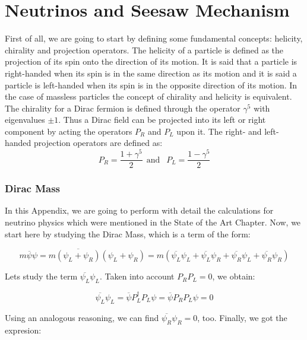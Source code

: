 \chapter{Neutrinos and Seesaw Mechanism} 
\label{apendice_neutrinos}

First of all, we are going to start by defining some fundamental concepts: helicity, chirality and projection operators. The helicity of a particle is defined as the projection of its spin onto the direction of its motion. It is said that a particle is right-handed when its spin is in the same direction as its motion and it is said a particle is left-handed when its spin is in the opposite direction of its motion. In the case of massless particles the concept of chirality and helicity is equivalent. The chirality for a Dirac fermion is defined through the operator $\gamma^5$ with eigenvalues $\pm 1$. Thus a Dirac field can be projected into its left or right component by acting the operators $P_R$ and $P_L$ upon it. The right- and left-handed projection operators are defined as:
\begin{equation}
P_R = \frac{1 + \gamma^5}{2} \ \ \text{and } \ \ P_L = \frac{1 - \gamma^5}{2}
\end{equation}


\subsection{Dirac Mass}
In this Appendix, we are going to perform with detail the calculations for neutrino physics which were mentioned in the State of the Art Chapter. Now, we start here by studying the Dirac Mass, which is a term of the form:

\begin{equation}
 m \overline{\psi} \psi = m \overline{(\psi_L + \psi_R)} (\psi_L + \psi_R) = m(\overline{\psi_L} \psi_L + \overline{\psi_L}\psi_R + \overline{\psi_R}\psi_L + \overline{\psi_R} \psi_R)
\end{equation}

Lets study the term $\overline{\psi_L}\psi_L$. Taken into account $P_R  P_L = 0$, we obtain:

\begin{equation}
 \overline{\psi_L}\psi_L = \overline{\psi} {P}^{\dagger}_L P_L \psi = \overline{\psi}P_R  P_L \psi = 0
\end{equation}

Using an analogous reasoning, we can find $\overline{\psi_R}\psi_R = 0$, too. Finally, we got the expresion:

